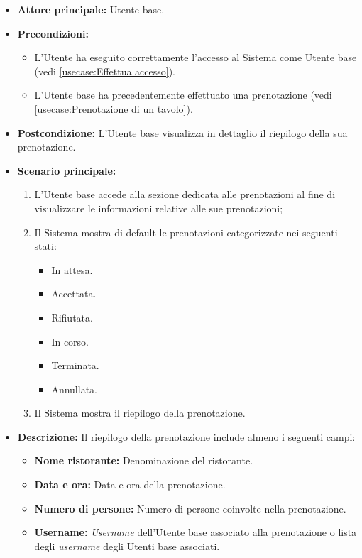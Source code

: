 \label{usecase:Visualizzazione del riepilogo prenotazione}
\begin{itemize}
	\item \textbf{Attore principale:} Utente base.

	\item \textbf{Precondizioni:}
	      \begin{itemize}
		      \item L'Utente ha eseguito correttamente l'accesso al Sistema come Utente base (vedi \autoref{usecase:Effettua accesso}).
		      \item L'Utente base ha precedentemente effettuato una prenotazione (vedi \autoref{usecase:Prenotazione di un tavolo}).
	      \end{itemize}


	\item \textbf{Postcondizione:}
	      L'Utente base visualizza in dettaglio il riepilogo della sua prenotazione.

	\item \textbf{Scenario principale:}
	      \begin{enumerate}
		      \item L'Utente base accede alla sezione dedicata alle prenotazioni al fine di visualizzare le informazioni relative alle sue prenotazioni;
		      \item Il Sistema mostra di default le prenotazioni categorizzate nei seguenti stati:
		            \begin{itemize}
			            \item In attesa.
			            \item Accettata.
			            \item Rifiutata.
			            \item In corso.
			            \item Terminata.
			            \item Annullata.
		            \end{itemize}
		      \item Il Sistema mostra il riepilogo della prenotazione.
	      \end{enumerate}

	\item \textbf{Descrizione:}
	      Il riepilogo della prenotazione include almeno i seguenti campi:
	      \begin{itemize}
		      \item \textbf{Nome ristorante:} Denominazione del ristorante.
		      \item \textbf{Data e ora:} Data e ora della prenotazione.
		      \item \textbf{Numero di persone:} Numero di persone coinvolte nella prenotazione.
		      \item \textbf{Username:} \textit{Username} dell'Utente base associato alla prenotazione o lista degli \textit{username} degli Utenti base associati.


\end{itemize}
\end{itemize}
